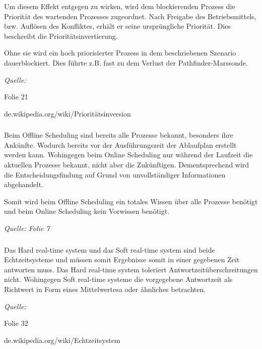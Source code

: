 \documentclass[a4paper]{article}
\newenvironment{quelle}{\medskip \noindent\itshape Quelle: }{\bigskip}
\begin{document}
Um diesem Effekt entgegen zu wirken, wird dem blockierenden Prozess die Priorität des wartenden Prozesses zugeordnet. Nach Freigabe des Betriebsmittels, bzw. Auflösen des Konfliktes, erhält er seine ursprüngliche Priorität.  
Dies beschreibt die Prioritätsinvertierung.

Ohne sie wird ein hoch priorisierter Prozess in dem beschriebenen Szenario dauerblockiert. Dies führte z.B. fast zu dem Verlust der Pathfinder-Marssonde.

\begin{quelle}
  
  Folie 21
  
  de.wikipedia.org/wiki/Prioritätsinversion
\end{quelle}

\subsubsection{}
Beim Offline Scheduling sind bereits alle Prozesse bekannt, besonders ihre Ankünfte. Wodurch bereits
vor der Ausführungszeit der Ablaufplan erstellt werden kann. Wohingegen beim Online Scheduling nur während
der Laufzeit die aktuellen Prozesse bekannt, nicht aber die Zukünftigen.
Dementsprechend wird die Entscheidungsfindung auf Grund von 
unvollständiger Informationen abgehandelt.

Somit wird beim Offline Scheduling ein totales Wissen über alle Prozesse benötigt und beim Online Scheduling kein Vorwissen benötigt.

\begin{quelle}
  Folie 7
\end{quelle}

\subsubsection{}
Das Hard real-time system und das Soft real-time system sind beide Echtzeitsysteme und müssen somit
Ergebnisse somit in einer gegebenen Zeit antworten muss. Das Hard real-time system toleriert
Antwortzeitüberschreitungen nicht. Wohingegen Soft real-time systeme die vorgegebene Antwortzeit als Richtwert in Form eines Mittelwertesa oder ähnliches betrachten.

\begin{quelle}

  Folie 32
  
  de.wikipedia.org/wiki/Echtzeitsystem

\end{quelle}
\end{document}
